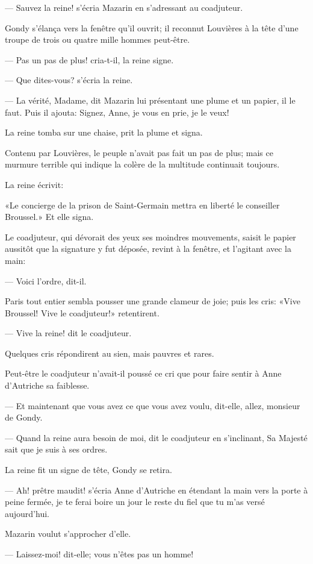 — Sauvez la reine! s'écria Mazarin en s'adressant au coadjuteur.

Gondy s'élança vers la fenêtre qu'il ouvrit; il reconnut Louvières à la tête d'une troupe de trois ou quatre mille hommes peut-être.

— Pas un pas de plus! cria-t-il, la reine signe.

— Que dites-vous? s'écria la reine.

— La vérité, Madame, dit Mazarin lui présentant une plume et un papier, il le faut. Puis il ajouta: Signez, Anne, je vous en prie, je le veux!

La reine tomba sur une chaise, prit la plume et signa.

Contenu par Louvières, le peuple n'avait pas fait un pas de plus; mais ce murmure terrible qui indique la colère de la multitude continuait toujours.

La reine écrivit:

«Le concierge de la prison de Saint-Germain mettra en liberté le conseiller Broussel.» Et elle signa.

Le coadjuteur, qui dévorait des yeux ses moindres mouvements, saisit le papier aussitôt que la signature y fut déposée, revint à la fenêtre, et l'agitant avec la main:

— Voici l'ordre, dit-il.

Paris tout entier sembla pousser une grande clameur de joie; puis les cris: «Vive Broussel! Vive le coadjuteur!» retentirent.

— Vive la reine! dit le coadjuteur.

Quelques cris répondirent au sien, mais pauvres et rares.

Peut-être le coadjuteur n'avait-il poussé ce cri que pour faire sentir à Anne d'Autriche sa faiblesse.

— Et maintenant que vous avez ce que vous avez voulu, dit-elle, allez, monsieur de Gondy.

— Quand la reine aura besoin de moi, dit le coadjuteur en s'inclinant, Sa Majesté sait que je suis à ses ordres.

La reine fit un signe de tête, Gondy se retira.

— Ah! prêtre maudit! s'écria Anne d'Autriche en étendant la main vers la porte à peine fermée, je te ferai boire un jour le reste du fiel que tu m'as versé aujourd'hui.

Mazarin voulut s'approcher d'elle.

— Laissez-moi! dit-elle; vous n'êtes pas un homme!

